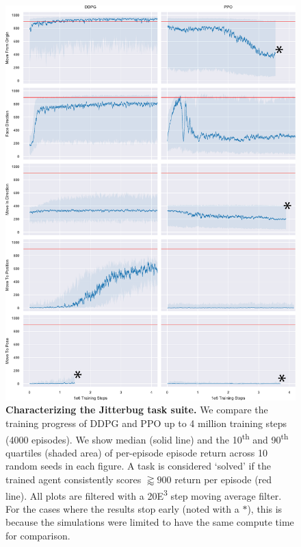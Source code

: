 \documentclass[letterpaper, 10 pt, conference]{ieeeconf}
\begin{document}


\begin{figure}[h]
    
    \centering
    \includegraphics[height=0.9\textheight]{fig-rl-perf_4_star}

        \caption{
        \textbf{Characterizing the Jitterbug task suite.}
        We compare the training progress of DDPG and PPO up to 4 million training steps (4000 episodes).
        We show median (solid line) and the 10\textsuperscript{th} and 90\textsuperscript{th} quartiles (shaded area) of per-episode episode return across 10 random seeds in each figure.
        A task is considered `solved' if the trained agent consistently scores $\gtrapprox 900$ return per episode (red line).  All plots are filtered with a 20{\tiny E}\textsuperscript{3} step moving average filter.  For the cases where the results stop early (noted with a {\LARGE$\ast$}), this is because the simulations were limited to have the same compute time for comparison. 
    }    
    \label{fig:rl-perf}
\end{figure}
\end{document}
